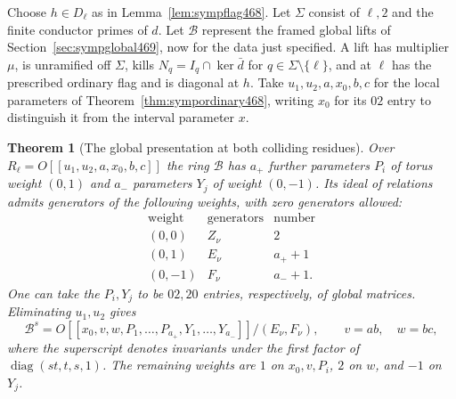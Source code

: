 \documentclass[a4paper,11pt]{article}
\newtheorem{theorem}[proposition]{Theorem}
\theoremstyle{definition}
\theoremstyle{remark}
\numberwithin{equation}{section}
\begin{document}
Choose \(h\in D_\ell\) as in Lemma~\ref{lem:sympflag468}.
Let \(\Sigma\) consist of \(\ell,2\) and the finite conductor primes
of \(d\). Let \(\mathcal B\) represent the framed global lifts of
Section~\ref{sec:sympglobal469}, now for the data just specified.
A lift has multiplier \(\mu\), is unramified off \(\Sigma\), kills
\(N_q=I_q\cap\ker\bar d\) for \(q\in\Sigma\setminus\{\ell\}\),
and at \(\ell\) has the prescribed ordinary flag and is diagonal at
\(h\). Take \(u_1,u_2,a,x_0,b,c\) for the local parameters of
Theorem~\ref{thm:sympordinary468}, writing \(x_0\) for its \(02\)
entry to distinguish it from the interval parameter \(x\).

\begin{theorem}[The global presentation at both colliding residues]
\leavevmode\label{thm:allglobalroots547}
Over \(R_\ell=O[[u_1,\allowbreak u_2,a,x_0,b,c]]\) the ring \(\mathcal B\)
has \(a_+\) further parameters \(P_i\) of torus weight \((0,1)\)
and \(a_-\) parameters \(Y_j\) of weight \((0,-1)\). Its ideal
of relations admits generators of the following weights, with zero
generators allowed:
\[
\begin{array}{c|c|c}
 \text{weight}&\text{generators}&\text{number}\\ \hline
 (0,0)&Z_\nu&2\\
 (0,1)&E_\nu&a_++1\\
 (0,-1)&F_\nu&a_-+1 .
\end{array}
\]
One can take the \(P_i,Y_j\) to be \(02,20\) entries, respectively,
of global matrices. Eliminating \(u_1,u_2\) gives
\[
 \mathcal B^{s}=
 O[[x_0,v,w,P_1,\ldots,P_{a_+},Y_1,\ldots,Y_{a_-}]]
       /(E_\nu,F_\nu),\qquad v=ab,\quad w=bc,
\]
where the superscript denotes invariants under the first factor of
\(\operatorname{diag}(st,t,s,1)\). The remaining weights are \(1\) on
\(x_0,v,P_i\), \(2\) on \(w\), and \(-1\) on \(Y_j\).
\end{theorem}
\end{document}
